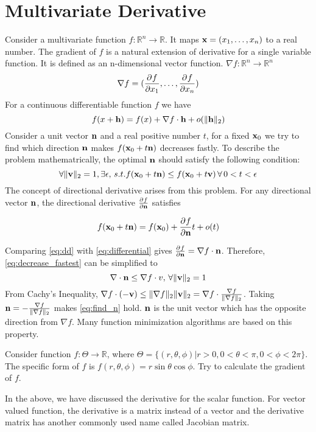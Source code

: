 \section{Multivariate Derivative}
Consider a multivariate function $f: \mathbb{R}^n \to \mathbb{R}$. It maps $\mathbf{x} = (x_1, \dots, x_n) $ to a real number.
The gradient of $f$ is a natural extension of derivative for a single variable function. It is defined as an n-dimensional vector function.
$\nabla f: \mathbb{R}^n \to \mathbb{R}^n $
\begin{equation}
\nabla f = (\frac{\partial^{} f}{\partial x_1}, \dots, \frac{\partial^{} f}{\partial x_n})
\end{equation}
For a continuous differentiable function $f$ we have 
\begin{equation}\label{eq:differential}
f(x + \mathbf{h} ) = f(x) + \nabla f \cdot \mathbf{h} + o(\lVert\mathbf{h}\rVert_2)
\end{equation}
Consider a unit vector $\mathbf{n}$ and a real positive number $t$, for a fixed $\mathbf{x}_0$ we try to find which direction $\mathbf{n}$ makes $f(\mathbf{x}_0 + t \mathbf{n})$ decreases fastly. To describe the problem mathematrically, the optimal $\mathbf{n}$ should satisfy the following condition:
\begin{equation}\label{eq:decrease_fastest}
\forall \lVert\mathbf{v}\rVert_2=1, \exists \epsilon,  \, s.t. f(\mathbf{x}_0 + t \mathbf{n}) \leq f(\mathbf{x}_0 + t \mathbf{v}) \,\forall\, 0 < t < \epsilon
\end{equation}
The concept of directional derivative arises from this problem. For any directional vector $\mathbf{n}$, the directional derivative $\frac{\partial^{} f}{\partial \mathbf{n}}$ satisfies 

\begin{equation}\label{eq:dd}
f(\mathbf{x}_0 + t \mathbf{n}) = f(\mathbf{x}_0) + 
 \frac{\partial^{} f}{\partial \mathbf{n}} t + o(t)
 \end{equation}
 
Comparing \eqref{eq:dd} with \eqref{eq:differential} gives $\frac{\partial^{} f}{\partial \mathbf{n}} = \nabla f \cdot \mathbf{n}$.  Therefore, \eqref{eq:decrease_fastest} can be simplified to 
\begin{equation}\label{eq:find_n}
\nabla \cdot \mathbf{n} \leq \nabla f \cdot{v}, \, \forall \lVert\mathbf{v}\rVert_2=1
\end{equation}
From Cachy's Inequality, $ \nabla f \cdot (-\mathbf{v}) \leq \lVert\nabla f\rVert_2 \lVert\mathbf{v}\rVert_2 = \nabla f \cdot \frac{\nabla f}{\lVert\nabla f\rVert_2}$. Taking $\mathbf{n} = -  \frac{\nabla f}{\lVert\nabla f\rVert_2} $ makes \eqref{eq:find_n} hold.
$\mathbf{n}$ is the unit vector which has the  opposite direction from $\nabla f $. Many function minimization algorithms are based on this property.

\begin{exercise}
Consider function $f: \Theta \to \mathbb{R}$, where $\Theta = \{(r, \theta, \phi)| r>0, 0<\theta<\pi, 0<\phi < 2\pi\}$. The specific form of $f$ is $f(r, \theta,\phi) = r \sin \theta \cos\phi$. Try to calculate the gradient of $f$.
\end{exercise}

In the above, we have discussed the derivative for the scalar function. For vector valued function, the derivative is a matrix instead of a vector and the derivative matrix has another commonly used name called Jacobian matrix.